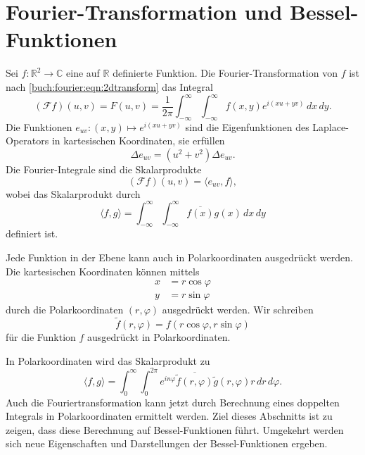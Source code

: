 %
%
%
\section{Fourier-Transformation und Bessel-Funktionen
\label{buch:fourier:section:fourier-und-bessel}}

Sei $f\colon \mathbb{R}^2\to\mathbb{C}$ eine auf $\mathbb{R}$ definierte
Funktion.
Die Fourier-Transformation von $f$ ist nach
\eqref{buch:fourier:eqn:2dtransform} das Integral
\begin{equation}
(\mathscr{F}f)(u,v)
=
F(u,v)
=
\frac{1}{2\pi}
\int_{-\infty}^\infty
\int_{-\infty}^\infty
f(x,y) e^{i(xu+yv)}
\,dx\,dy.
\label{buch:fourier:eqn:2dfourier}
\end{equation}
Die Funktionen $e_{uv}\colon (x,y)\mapsto e^{i(xu+yv)}$
sind die Eigenfunktionen des Laplace-Operators in kartesischen Koordinaten,
%
sie erfüllen
\[
\Delta e_{uv} = (u^2+v^2) \Delta e_{uv}.
\]
Die Fourier-Integrale sind die Skalarprodukte
\[
(\mathscr{F}f)(u,v)
=
\langle
e_{uv},
f
\rangle,
\]
wobei das Skalarprodukt durch
\[
\langle f,g\rangle
=
\int_{-\infty}^\infty
\int_{-\infty}^\infty
\overline{f(x)} g(x)
\,dx\,dy
\]
definiert ist.

Jede Funktion in der Ebene kann auch in Polarkoordinaten ausgedrückt werden.
Die kartesischen Koordinaten können mittels
\begin{align*}
x&=r\cos\varphi \\
y&=r\sin\varphi
\end{align*}
durch die Polarkoordinaten $(r,\varphi)$ ausgedrückt werden.
%
Wir schreiben
\[
\tilde{f}(r,\varphi)
=
f(r\cos\varphi,r\sin\varphi)
\]
für die Funktion $f$ ausgedrückt in Polarkoordinaten.

In Polarkoordinaten wird das Skalarprodukt zu
\[
\langle f,g\rangle
=
\int_0^\infty \int_{0}^{2\pi} e^{in\varphi}
\overline{
\tilde{f}(r,\varphi)
}
\tilde{g}(r,\varphi)
r\,dr\,d\varphi.
\]
Auch die Fouriertransformation kann jetzt durch Berechnung eines
doppelten Integrals in Polarkoordinaten ermittelt werden.
Ziel dieses Abschnitts ist zu zeigen, dass diese Berechnung auf
Bessel-Funktionen führt.
Umgekehrt werden sich neue Eigenschaften und Darstellungen der
Bessel-Funk\-tio\-nen ergeben.

%
%
